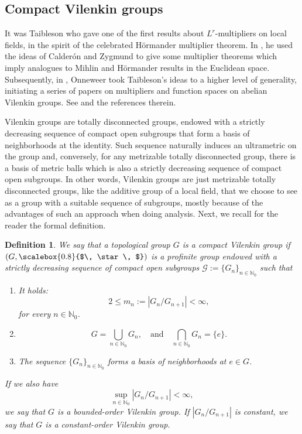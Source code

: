 \documentclass[12pt, reqno]{amsart}
\newtheorem{defi}{Definition}[section]
\newcommand{\1}{\mathds{1}}
\newcommand{\smallstar}{\scalebox{0.8}{$\, \star \, $}}
\begin{document}
\subsection{Compact Vilenkin groups}
It was Taibleson who gave one of the first results about $L^r$-multipliers on local fields, in the spirit of the celebrated Hörmander multiplier theorem. In \cite{Taibleson1970}, he used the ideas of Calderón and Zygmund to give some multiplier theorems which imply analogues to Mihlin and Hörmander results in the Euclidean space. Subsequently, in \cite{Onneweer1985}, Onneweer took Taibleson's ideas to a higher level of generality, initiating a series of papers on multipliers and function spaces on abelian Vilenkin groups. See \cite{Kitada1987, Onneweer1985, Onneweer1989, Yueping2002} and the references therein. 

Vilenkin groups are totally disconnected groups, endowed with a strictly decreasing sequence of compact open subgroups that form a basis of neighborhoods at the identity. Such sequence naturally induces an ultrametric on the group and, conversely, for any metrizable totally disconnected group, there is a basis of metric balls which is also a strictly decreasing sequence of compact open subgroups. In other words, Vilenkin groups are just metrizable totally disconnected groups, like the additive group of a local field, that we choose to see as a group with a suitable sequence of subgroups, mostly because of the advantages of such an approach when doing analysis. Next, we recall for the reader the formal definition.

\begin{defi}\normalfont
We say that a topological group $G$ is a \emph{compact Vilenkin group} if $(G, \smallstar)$ is a profinite group endowed with a strictly decreasing sequence of compact open subgroups $\mathcal{G} := \{G_n\}_{n \in \mathbb{N}_0}$ such that
\begin{enumerate}
    \item It holds:
    \[
    2 \leq m_n := |G_n / G_{n+1}| < \infty,
    \]
    for every $n \in \mathbb{N}_0$.
    \item 
    \[
    G = \bigcup_{n \in \mathbb{N}_0} G_n, \quad \text{and} \quad \bigcap_{n \in \mathbb{N}_0} G_n = \{e\}.
    \]
    \item The sequence $\{G_n\}_{n \in \mathbb{N}_0}$ forms a basis of neighborhoods at $e \in G$.
\end{enumerate}

If we also have
\[
\sup_{n \in \mathbb{N}_0} |G_n / G_{n+1}| < \infty,
\]
we say that $G$ is a \emph{bounded-order Vilenkin group}. If $|G_n / G_{n+1}|$ is constant, we say that $G$ is a \emph{constant-order Vilenkin group}.    
\end{defi}
\end{document}
